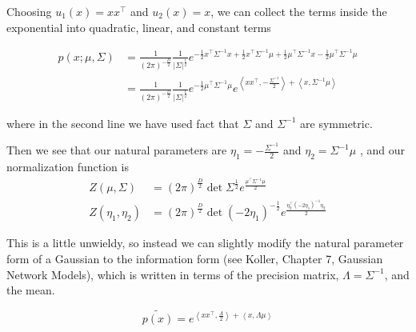 \documentclass[a4paper]{article}
\begin{document}
Choosing $u_1(x) = x x^\intercal$ and $u_2(x) = x$, we can collect the terms inside the exponential into quadratic, linear, and constant terms

\begin{equation}
  \begin{split}
    p( x; \mu, \Sigma) &= 
      \frac{1}{\left( 2 \pi \right) ^{ - \frac{D}{2} } }
      \frac{1}{\lvert \Sigma \rvert ^{ \frac{1}{2} } }
      e^{ 
        - \frac{1}{2} x^\intercal \Sigma^{-1} x
        + \frac{1}{2} x^\intercal \Sigma^{-1} \mu
        + \frac{1}{2} \mu^\intercal \Sigma^{-1} x
        - \frac{1}{2} \mu^\intercal \Sigma^{-1} \mu 
      } \\
    &= 
      \frac{1}{\left( 2 \pi \right) ^{ - \frac{D}{2} } }
      \frac{1}{\lvert \Sigma \rvert ^{ \frac{1}{2} } } 
      e^{ 
	- \frac{1}{2} \mu^\intercal \Sigma^{-1} \mu 
      } 
      e^{ 
	\left< x x^\intercal, - \frac{\Sigma^{-1}}{2} \right>
	+ \left< x, \Sigma^{-1} \mu \right> 
      } 
  \end{split}
  \label{}
\end{equation}

where in the second line we have used fact that $\Sigma$ and $\Sigma^{-1}$ are symmetric.

Then we see that our natural parameters are 
$\eta_1 = - \frac{ \Sigma^{-1} }{ 2 }$
and
$\eta_2 = \Sigma^{-1} \mu$
, and our normalization function is
\begin{equation}
  \begin{split}
    Z(\mu,\Sigma) &= 
      \left( 2 \pi \right) ^ { \frac{D}{2} }
      \det \Sigma ^{ \frac{1}{2} } 
      e^{ \frac{ \mu^\intercal \Sigma^{-1} \mu }{ 2 } } \\
    Z( \eta_1,\eta_2) &= 
      \left( 2 \pi \right) ^{\frac{D}{2}} 
      \det ( - 2 \eta_1 )^{- \frac{1}{2} } 
      e^{ \frac{ \eta_2^\intercal ( - 2 \eta_1) ^{-1} \eta_2 }{2} }
  \end{split}
  \label{}
\end{equation}

This is a little unwieldy, so instead we can slightly modify the natural parameter form of a Gaussian to the information form (see Koller, Chapter 7, Gaussian Network Models), which is written in terms of the precision matrix, $\Lambda = \Sigma^{-1}$, and the mean.

\begin{equation}
  \tilde{p(x)} = 
    e^{
      \left< x x^\intercal, \frac{\Lambda}{2} \right>
      + \left< x, \Lambda \mu \right>
    }
  \label{Information form}
\end{equation}
\end{document}
